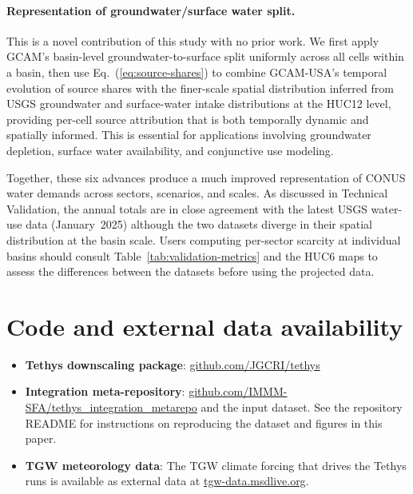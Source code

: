 \documentclass[fleqn,10pt]{wlscirep}
\begin{document}
\paragraph{Representation of groundwater/surface water split.} This is a novel contribution of this study with no prior work. We first apply GCAM's basin-level groundwater-to-surface split uniformly across all cells within a basin, then use Eq.~(\ref{eq:source-shares}) to combine GCAM-USA's temporal evolution of source shares with the finer-scale spatial distribution inferred from USGS groundwater and surface-water intake distributions at the HUC12 level, providing per-cell source attribution that is both temporally dynamic and spatially informed. This is essential for applications involving groundwater depletion, surface water availability, and conjunctive use modeling. 

Together, these six advances produce a much improved representation of CONUS water demands across sectors, scenarios, and scales. As discussed in Technical Validation, the annual totals are in close agreement with the latest USGS water-use data (January~2025) although the two datasets diverge in their spatial distribution at the basin scale. Users computing per-sector scarcity at individual basins should consult Table~\ref{tab:validation-metrics} and the HUC6 maps to assess the differences between the datasets before using the projected data.

\section*{Code and external data availability}

\begin{itemize}
    \item \textbf{Tethys downscaling package}\cite{niazi_2026_20552731}: \href{https://github.com/JGCRI/tethys}{github.com/JGCRI/tethys} 
    \item \textbf{Integration meta-repository}\cite{cambrackenIMMMSFATethys_integration_metarepoV1002026}: \href{https://github.com/IMMM-SFA/tethys_integration_metarepo}{github.com/IMMM-SFA/tethys\_integration\_metarepo} and the input dataset\cite{brackenDataTethys_integration_metarepo}. See the repository README for instructions on reproducing the dataset and figures in this paper.
    \item \textbf{TGW meteorology data}: The TGW climate forcing\cite{Jones2023TGW} that drives the Tethys runs is available as external data at \href{https://tgw-data.msdlive.org/}{tgw-data.msdlive.org}. 
\end{itemize}
\end{document}
